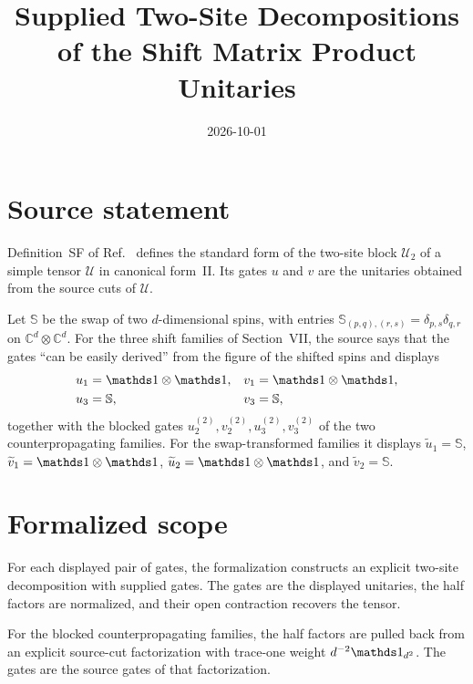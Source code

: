 \documentclass{article}
\title{Supplied Two-Site Decompositions of the Shift Matrix Product Unitaries}
\author{}
\date{2026-10-01}
\begin{document}
\maketitle
{}

\section{Source statement}

Definition~SF of Ref.~\cite{Cirac2017MPU} defines the standard form of the
two-site block $\mathcal U_2$ of a simple tensor $\mathcal U$ in canonical
form~II. Its gates $u$ and $v$ are the unitaries obtained from the source cuts
of $\mathcal U$.

Let $\mathbb S$ be the swap of two $d$-dimensional spins, with entries
$\mathbb S_{(p,q),(r,s)}=\delta_{p,s}\delta_{q,r}$ on
$\mathbb C^d\otimes\mathbb C^d$. For the three shift families of
Section~VII, the source says that the gates ``can be easily derived'' from
the figure of the shifted spins and displays
\begin{align}
    u_1 & =\Id\otimes\Id, & v_1 & =\Id\otimes\Id,
    \label{eq:mpu_shift_supplied_standard_forms_1} \\
    u_3 & =\mathbb S,     & v_3 & =\mathbb S,
    \label{eq:mpu_shift_supplied_standard_forms_source_gates}
\end{align}
together with the blocked gates $u_2^{(2)},v_2^{(2)},u_3^{(2)},v_3^{(2)}$ of
the two counterpropagating families. For the swap-transformed families it
displays $\widetilde u_1=\mathbb S$, $\widetilde v_1=\Id\otimes\Id$,
$\widetilde u_2=\Id\otimes\Id$, and $\widetilde v_2=\mathbb S$.

\section{Formalized scope}

For each displayed pair of gates, the formalization constructs an explicit
two-site decomposition with supplied gates. The gates are the displayed
unitaries, the half factors are normalized, and their open contraction
recovers the tensor.

For the blocked counterpropagating families, the half factors are pulled back
from an explicit source-cut factorization with trace-one weight
$d^{-2}\Id_{d^2}$. The gates are the source gates of that factorization.
\end{document}
